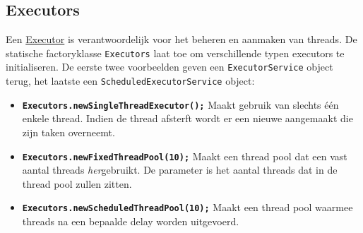 \documentclass{report}
\begin{document}
\subsection{Executors}
Een \underline{Executor} is verantwoordelijk voor het beheren en aanmaken van threads. De statische factoryklasse \texttt{Executors} laat toe om verschillende typen executors te initialiseren. De eerste twee voorbeelden geven een \texttt{ExecutorService} object terug, het laatste een \texttt{ScheduledExecutorService} object:
\begin{itemize}
	\item[\info] \textbf{\texttt{Executors.newSingleThreadExecutor();}} Maakt gebruik van slechts één enkele thread. Indien de thread afsterft wordt er een nieuwe aangemaakt die zijn taken overneemt. 
	\item[\info] \textbf{\texttt{Executors.newFixedThreadPool(10);}} Maakt een thread pool dat een vast aantal threads \emph{her}gebruikt. De parameter is het aantal threads dat in de thread pool zullen zitten.
	\item[\info] \textbf{\texttt{Executors.newScheduledThreadPool(10);}} Maakt een thread pool waarmee threads na een bepaalde delay worden uitgevoerd.
\end{itemize}
\end{document}
